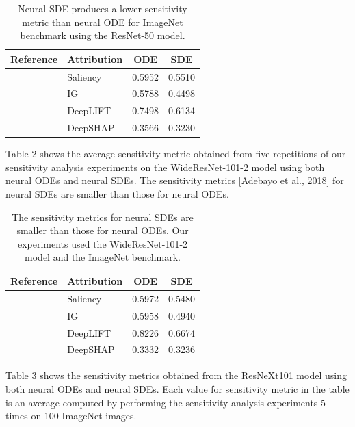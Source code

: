 \documentclass[10pt,twocolumn]{article}
\begin{document}
\begin{table}[h!]
\centering
\caption{Neural SDE produces a lower sensitivity metric than neural ODE for ImageNet benchmark using the ResNet-50 model.}
\begin{tabular}{p{4cm}lcc}
\toprule
Reference & Attribution & ODE & SDE \\
\midrule
\cite{adebayo2018sanity} & Saliency & 0.5952 & 0.5510 \\
\cite{adebayo2018sanity} & IG & 0.5788 & 0.4498 \\
\cite{adebayo2018sanity} & DeepLIFT & 0.7498 & 0.6134 \\
\cite{adebayo2018sanity} & DeepSHAP & 0.3566 & 0.3230 \\
\bottomrule
\end{tabular}
\label{tab:resnet50}
\end{table}

Table 2 shows the average sensitivity metric obtained from five repetitions of our sensitivity analysis experiments on the WideResNet-101-2 model using both neural ODEs and neural SDEs. The sensitivity metrics [Adebayo et al., 2018] for neural SDEs are smaller than those for neural ODEs.

\begin{table}[h!]
\centering
\caption{The sensitivity metrics for neural SDEs are smaller than those for neural ODEs. Our experiments used the WideResNet-101-2 model and the ImageNet benchmark.}
\begin{tabular}{p{4cm}lcc}
\toprule
Reference & Attribution & ODE & SDE \\
\midrule
\cite{adebayo2018sanity} & Saliency & 0.5972 & 0.5480 \\
\cite{adebayo2018sanity} & IG & 0.5958 & 0.4940 \\
\cite{adebayo2018sanity} & DeepLIFT & 0.8226 & 0.6674 \\
\cite{adebayo2018sanity} & DeepSHAP & 0.3332 & 0.3236 \\
\bottomrule
\end{tabular}
\label{tab:wideresnet}
\end{table}

Table 3 shows the sensitivity metrics obtained from the ResNeXt101 model using both neural ODEs and neural SDEs. Each value for sensitivity metric in the table is an average computed by performing the sensitivity analysis experiments 5 times on 100 ImageNet images.
\end{document}
